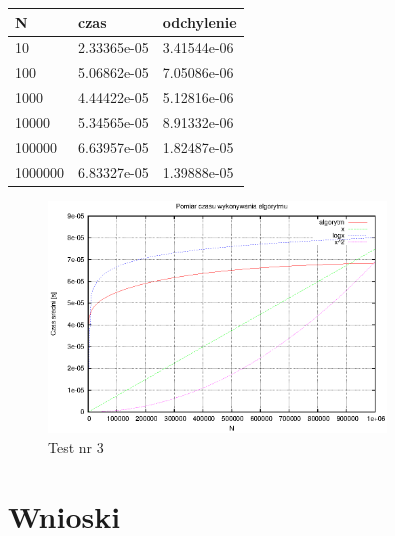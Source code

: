 \documentclass[a4paper,11pt]{article}
\begin{document}
\begin{enumerate}
\begin{table}[th]
      \begin{tabular}{l|l|l}
	\hline
	N & czas & odchylenie \\
    \hline
  10 & 2.33365e-05 &  3.41544e-06\\
  \hline
100 & 5.06862e-05 &  7.05086e-06\\
\hline
1000 & 4.44422e-05 &  5.12816e-06\\
\hline
10000 & 5.34565e-05 &  8.91332e-06\\
\hline
100000 & 6.63957e-05 &  1.82487e-05\\
\hline
1000000 & 6.83327e-05 &  1.39888e-05\\
\hline
    \end{tabular}
    \end{table}
    \newpage
\begin{figure}[th]
\centering
\includegraphics[width=0.8\textwidth]{../prj/wykres11.eps}
\caption{Test nr 3}
\label{Test nr 3}
\end{figure} 
\end{enumerate}

\section{Wnioski}
\end{document}
